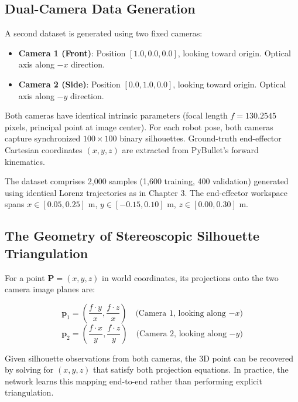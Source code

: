 \documentclass[12pt,a4paper,oneside]{report}
\begin{document}
\subsection{Dual-Camera Data Generation}

A second dataset is generated using two fixed cameras:

\begin{itemize}
    \item \textbf{Camera 1 (Front)}: Position $[1.0, 0.0, 0.0]$, looking toward origin. Optical axis along $-x$ direction.
    \item \textbf{Camera 2 (Side)}: Position $[0.0, 1.0, 0.0]$, looking toward origin. Optical axis along $-y$ direction.
\end{itemize}

Both cameras have identical intrinsic parameters (focal length $f = 130.2545$ pixels, principal point at image center). For each robot pose, both cameras capture synchronized $100 \times 100$ binary silhouettes. Ground-truth end-effector Cartesian coordinates $(x, y, z)$ are extracted from PyBullet's forward kinematics.

The dataset comprises 2,000 samples (1,600 training, 400 validation) generated using identical Lorenz trajectories as in Chapter 3. The end-effector workspace spans $x \in [0.05, 0.25]$ m, $y \in [-0.15, 0.10]$ m, $z \in [0.00, 0.30]$ m.

\subsection{The Geometry of Stereoscopic Silhouette Triangulation}

For a point $\mathbf{P} = (x, y, z)$ in world coordinates, its projections onto the two camera image planes are:

\begin{equation}
\mathbf{p}_1 = \left( \frac{f \cdot y}{x}, \frac{f \cdot z}{x} \right) \quad \text{(Camera 1, looking along $-x$)}
\end{equation}
\begin{equation}
\mathbf{p}_2 = \left( \frac{f \cdot x}{y}, \frac{f \cdot z}{y} \right) \quad \text{(Camera 2, looking along $-y$)}
\end{equation}

Given silhouette observations from both cameras, the 3D point can be recovered by solving for $(x, y, z)$ that satisfy both projection equations. In practice, the network learns this mapping end-to-end rather than performing explicit triangulation.
\end{document}
